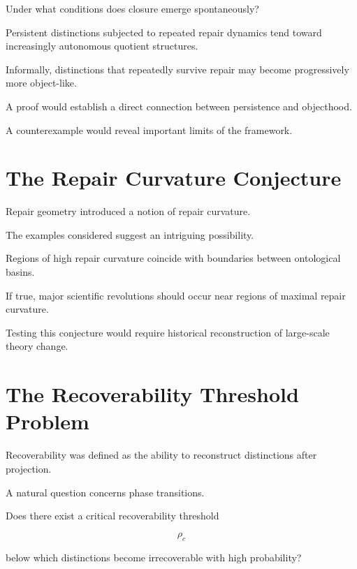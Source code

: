 \documentclass[11pt,oneside,openany]{book}
\begin{document}
Under what conditions does closure emerge spontaneously?

\begin{conjecture}

Persistent distinctions subjected to repeated repair dynamics tend toward increasingly autonomous quotient structures.

\end{conjecture}

Informally, distinctions that repeatedly survive repair may become progressively more object-like.

A proof would establish a direct connection between persistence and objecthood.

A counterexample would reveal important limits of the framework.

\section{The Repair Curvature Conjecture}

Repair geometry introduced a notion of repair curvature.

The examples considered suggest an intriguing possibility.

\begin{conjecture}

Regions of high repair curvature coincide with boundaries between ontological basins.

\end{conjecture}

If true, major scientific revolutions should occur near regions of maximal repair curvature.

Testing this conjecture would require historical reconstruction of large-scale theory change.

\section{The Recoverability Threshold Problem}

Recoverability was defined as the ability to reconstruct distinctions after projection.

A natural question concerns phase transitions.

\begin{problem}

Does there exist a critical recoverability threshold

\[
\rho_c
\]

below which distinctions become irrecoverable with high probability?

\end{problem}
\end{document}

